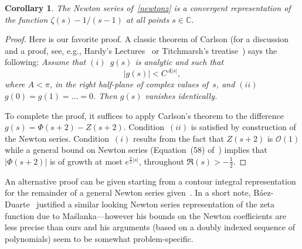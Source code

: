 \documentclass{amsart}
\def\C{\mathbb{C}}
\def\ds{\displaystyle}
\newtheorem{corollary}{Corollary}
\begin{document}
\begin{corollary}\label{newton-cor} The Newton series of~\eqref{newtonz} 
is a convergent representation of the function $\zeta(s)-1/(s-1)$
at all points $s\in\C$.
\end{corollary}
\begin{proof} 
Here  is our favorite  proof.  A   classic theorem  of Carlson  (for a
discussion        and      a     proof,     see,      e.g.,    Hardy's
Lectures~\cite[pp.~188-191]{Hardy78}          or          Titchmarsh's
treatise~\cite[\S5.81]{Titchmarsh39})  says the following:
\emph{Assume that $(i)$~$g(s)$ is
analytic and such that
\[
\left|g(s)\right|<C^{A|s|},
\]
where $A<\pi$, in the right half-plane of complex values of~$s$,
and $(ii)$~$g(0)=g(1)=\ldots=0$. Then $g(s)$ vanishes identically.}


To complete the proof, it  suffices to apply  Carlson's theorem to the
difference    $g(s)=\Phi(s+2)-Z(s+2)$.
Condition~$(ii)$ is    satisfied  by   construction  of    the  Newton
series. Condition~$(i)$ results from  the fact that $Z(s+2)$ is $\mathcal{O}(1)$
while  a general bound  on Newton series
(Equation~(58) of~\cite[p.~228]{Norlund54})
implies
that $|\Phi(s+2)|$  is of 
growth at most $e^{\frac{\pi}{2}|s|}$, throughout $\Re(s)>-\frac12$.
% 
% 
% 
\end{proof}

An alternative proof can be given starting from a contour integral representation for the remainder of 
a general Newton series given~\cite[p.~223]{Norlund54}. In a short note, B\'aez-Duarte~\cite{Baez03}
justified a similar looking Newton series representation of the zeta function due to Ma\'slanka---however
his bounds on the Newton coefficients are less precise than ours and his arguments (based on
a doubly indexed sequence of polynomials) seem to be somewhat problem-specific.
\end{document}
